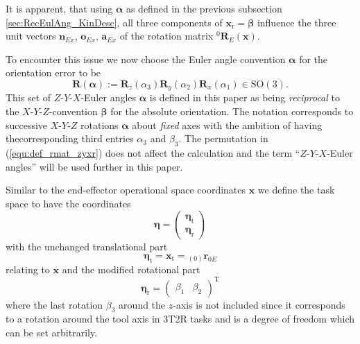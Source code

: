 \documentclass[twocolumn,10pt]{IFTOMM}
\newcommand{\bm}[1]{\boldsymbol{#1}}
\newcommand{\ortvek}[4]{{ }_{(#1)}{\boldsymbol{#2}}^{#3}_{#4} }
\newcommand{\rotmat}[2]{{{ }^{#1}\boldsymbol{R}}_{#2}}
\newcommand{\transp}[0]{{\mathrm{T}}}
\begin{document}
It is apparent, that using $\bm{\alpha}$ as defined in the previous subsection\,\ref{sec:RecEulAng_KinDesc}, all three components of $\bm{x}_{\mathrm{r}}=\bm{\beta}$ influence the three unit vectors $\bm{n}_{Ex}$, $\bm{o}_{Ex}$, $\bm{a}_{Ex}$ of the rotation matrix $\rotmat{0}{E}(\bm{x})$.

To encounter this issue we now choose the Euler angle convention $\bm{\alpha}$ for the orientation error to be 
%
\begin{equation}
\bm{R}(\bm{\alpha}) := \bm{R}_z(\alpha_3) \bm{R}_y(\alpha_2) \bm{R}_x(\alpha_1) \in \mathrm{SO(3)}.
\label{equ:def_rmat_zyxr}
\end{equation}
%
This set of $Z$-$Y$-$X$-Euler angles $\bm{\alpha}$ is defined in this paper as being \emph{reciprocal} to the $X$-$Y$-$Z$-convention $\bm{\beta}$ for the absolute orientation.
The notation corresponds to successive $X$-$Y$-$Z$ rotations $\bm{\alpha}$ about \emph{fixed} axes with the ambition of having thecorresponding third entries $\alpha_3$ and $\beta_3$.
The permutation in (\ref{equ:def_rmat_zyxr}) does not affect the calculation and the term ``$Z$-$Y$-$X$-Euler angles'' will be used further in this paper.

Similar to the end-effector operational space coordinates $\bm{x}$ we define the task space to have the coordinates
%
\begin{equation}
\bm{\eta}
=
\begin{pmatrix}
\bm{\eta}_{\mathrm{t}} \\
\bm{\eta}_{\mathrm{r}}
\end{pmatrix}
\end{equation}  
%
with the unchanged translational part
%
\begin{equation}
\bm{\eta}_{\mathrm{t}}
=
\bm{x}_{\mathrm{t}}
=
\ortvek{0}{r}{}{0E}
\end{equation}  
%
relating to $\bm{x}$ and the modified rotational part
%
\begin{equation}
\bm{\eta}_{\mathrm{r}}
=
\begin{pmatrix}
\beta_1  & \beta_2
\end{pmatrix}^\transp
\label{equ:etar_def}
\end{equation}
%
where the last rotation $\beta_3$ around the $z$-axis is not included since it corresponds to a rotation around the tool axis in 3T2R tasks and is a degree of freedom which can be set arbitrarily.
\end{document}
